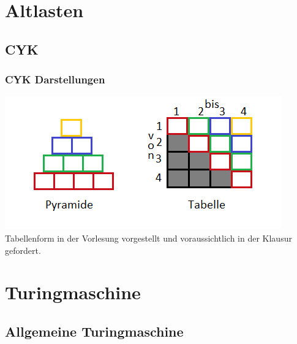 


\section{Altlasten}
\subsection{CYK}
\begin{frame}
	\frametitle{CYK Darstellungen}
	\includegraphics[width=1.25 \textheight]{images/CYK.png}~\\
	Tabellenform in der Vorlesung vorgestellt und voraussichtlich in der Klausur gefordert.
\end{frame}

\section{Turingmaschine}
\subsection{Allgemeine Turingmaschine}
